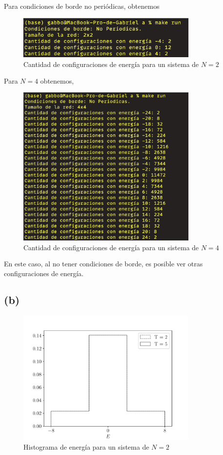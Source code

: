 \documentclass[11pt,a4paper]{article}
\begin{document}
Para condiciones de borde no periódicas, obtenemos
\begin{figure}[H]
    \centering
    \includegraphics[width=0.8\textwidth]{p2/a/p2_3.png}
    \caption{Cantidad de configuraciones de energía para un sistema de $N=2$}
    \label{fig:p2_3}
\end{figure}
Para $N = 4$ obtenemos,
\begin{figure}[H]
    \centering
    \includegraphics[width=0.8\textwidth]{p2/a/p2_4.png}
    \caption{Cantidad de configuraciones de energía para un sistema de $N=4$}
    \label{fig:p2_4}
\end{figure}
En este caso, al no tener condiciones de borde, es posible ver otras configuraciones de energía. 

\subsection*{(b)}


\begin{figure}[H]
    \centering
    \includegraphics[width=0.8\textwidth]{p2/b/N2_energy_GrayFlip.pdf}
    \caption{Histograma de energía para un sistema de $N=2$}
    \label{fig:p2_4}
\end{figure}
\end{document}
